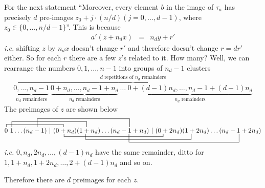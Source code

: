 \documentclass[aps,preprint,preprintnumbers,nofootinbib,showpacs,prd]{revtex4-1}
\newcommand{\ie}{{\it i.e.} }
\newcommand{\nbea}{\begin{eqnarray*}}
\newcommand{\neea}{\end{eqnarray*}}
\begin{document}
For the next statement ``Moreover, every element $b$ in the image of $\tau_a$ has precisely $d$ pre-images $z_0 + j \cdot (n/d) (j = 0, \dots , d - 1)$, where $z_0 \in \{0, . . . , n/d - 1\}$''. This is because
%
\nbea
a'(z + n_dx) & = & n_d y + r'
\neea
%
\ie shifting $z$ by $n_dx$ doesn't change $r'$ and therefore doesn't change $r = dr'$ either. So for each $r$ there are a few $z$'s related to it. How many? Well, we can rearrange the numbers $0,1, \dots, n-1$ into groups of $n_d-1$ clusters
%
\nbea
\overbrace{\underbrace{0, \dots, n_d - 1}_\text{$n_d$ remainders} ~ \underbrace{0 + n_d, \dots, n_d - 1 + n_d}_\text{$n_d$ remainders} ~ \dots ~ \underbrace{0 + (d-1) n_d, \dots, n_d - 1 + (d-1) n_d}_\text{$n_d$ remainders}}^\text{$d$ repetitions of $n_d$ remainders}
\neea
%
The preimages of $z$ are shown below
$$
\contraction{}{0}{~~~~~~~~~~~~~~~~~~~~~~~~~}{}
\contraction[2ex]{0~}{1}{~~~~~~~~~~~~~~~~~~~~~~~~~~~~~~~~~}{}
\contraction[3ex]{0~1~~~~~~~~~~}{1}{~~~~~~~~~~~~~~~~~~~~~~~~~~~~~~~~~~~~~~~~~}{}
\bcontraction{0~1~2~~(0~~~~~~~~~~~~~~~}{1}{~~~~~~~~~~~~~~~~~~~~~~~~~~~~~~~~~~~~~~~~~~~~}{}
\bcontraction[2ex]{0~1~2~~(0+n_d)(1~~~~~~~~~~~~~~}{1}{~~~~~~~~~~~~~~~~~~~~~~~~~~~~~~~~~~~~~~~~~~~~~~~}{}
\bcontraction[3ex]{0~1~2~~(0+n_d)(1 + n_d)(2~~~~~~~~~~~~~~~~~~~~~~~}{1}{~~~~~~~~~~~~~~~~~~~~~~~~~~~~~~~~~~~~~~~~~~~~~~~~~}{}
0~1 \dots (n_d-1)~|~(0+n_d)(1 + n_d) \dots (n_d - 1 + n_d) ~|~ (0+2n_d)(1 + 2n_d) \dots (n_d - 1 + 2n_d)
$$
\ie $0, n_d, 2n_d, \dots, (d-1)n_d$ have the same remainder, ditto for $1,1 + n_d, 1 + 2n_d, \dots, 2 + (d-1)n_d$ and so on.

Therefore there are $d$ preimages for each $z$.
\end{document}
